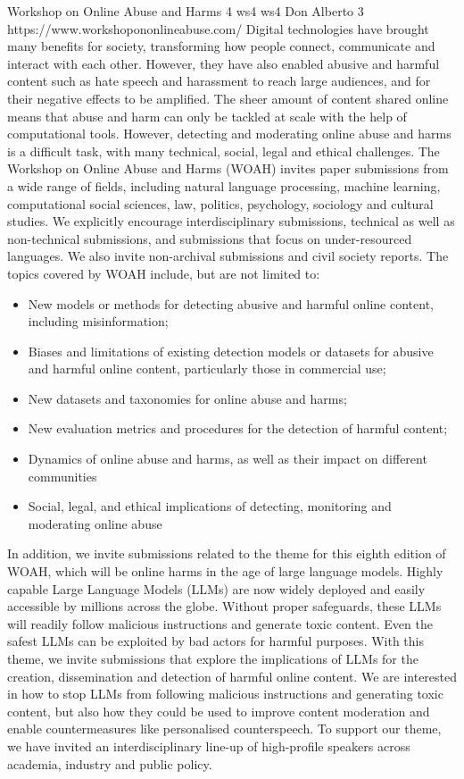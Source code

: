 \begin{wsschedulenolist}
{Workshop on Online Abuse and Harms}
{4}
{ws4}
{ws4}
{Don Alberto 3}
{https://www.workshopononlineabuse.com/}
    Digital technologies have brought many benefits for society, transforming how people connect, communicate and interact with each other. However, they have also enabled abusive and harmful content such as hate speech and harassment to reach large audiences, and for their negative effects to be amplified. The sheer amount of content shared online means that abuse and harm can only be tackled at scale with the help of computational tools. However, detecting and moderating online abuse and harms is a difficult task, with many technical, social, legal and ethical challenges. The Workshop on Online Abuse and Harms (WOAH) invites paper submissions from a wide range of fields, including natural language processing, machine learning, computational social sciences, law, politics, psychology, sociology and cultural studies. We explicitly encourage interdisciplinary submissions, technical as well as non-technical submissions, and submissions that focus on under-resourced languages. We also invite non-archival submissions and civil society reports. The topics covered by WOAH include, but are not limited to:

\begin{itemize}
    \item New models or methods for detecting abusive and harmful online content, including misinformation;
    \item Biases and limitations of existing detection models or datasets for abusive and harmful online content, particularly those in commercial use;
    \item New datasets and taxonomies for online abuse and harms;
    \item New evaluation metrics and procedures for the detection of harmful content;
    \item Dynamics of online abuse and harms, as well as their impact on different communities
    \item Social, legal, and ethical implications of detecting, monitoring and moderating online abuse
\end{itemize}

In addition, we invite submissions related to the theme for this eighth edition of WOAH, which will be online harms in the age of large language models. Highly capable Large Language Models (LLMs) are now widely deployed and easily accessible by millions across the globe. Without proper safeguards, these LLMs will readily follow malicious instructions and generate toxic content. Even the safest LLMs can be exploited by bad actors for harmful purposes. With this theme, we invite submissions that explore the implications of LLMs for the creation, dissemination and detection of harmful online content. We are interested in how to stop LLMs from following malicious instructions and generating toxic content, but also how they could be used to improve content moderation and enable countermeasures like personalised counterspeech. To support our theme, we have invited an interdisciplinary line-up of high-profile speakers across academia, industry and public policy.
\end{wsschedulenolist}
